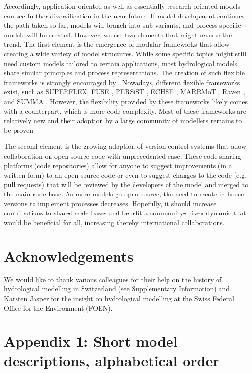 \documentclass[10pt,a4paper]{article}
\begin{document}
Accordingly, application-oriented as well as essentially
research-oriented models can see further diversification in the near
future. If model development continues the path taken so far, models
will branch into sub-variants, and process-specific models will be
created. However, we see two elements that might reverse the trend. The
first element is the emergence of modular frameworks that allow creating
a wide variety of model structures. While some specific topics might
still need custom models tailored to certain applications, most
hydrological models share similar principles and process
representations. The creation of such flexible frameworks is strongly
encouraged by \citet{Clark2011a}. Nowadays, different flexible
frameworks exist, such as SUPERFLEX, FUSE \citep{Clark2008},
PERSiST \citep{Futter2014}, ECHSE \citep{Kneis2015},
MARRMoT \citep{Knoben2019}, Raven \citep{Craig2020}, and
SUMMA \citep{Clark2015}. {However, the flexibility provided by these
frameworks likely comes with a counterpart, which is more code
complexity. Most of these frameworks are relatively new and their
adoption by a large community of modellers remains to be proven}. 

The second element is the growing adoption of version control systems
that allow collaboration on open-source code with unprecedented ease.
These code sharing platforms (code repositories) allow for anyone to
suggest improvements (in a written form) to an open-source code or even
to suggest changes to the code (e.g. pull requests) that will be
reviewed by the developers of the model and merged to the main code
base. As more models go open source, the need to create in-house
versions to implement processes decreases. Hopefully, it should increase
contributions to shared code bases and benefit a community-driven
dynamic that would be beneficial for all, increasing thereby
international collaborations.


\section*{Acknowledgements}

We would like to thank various colleagues for their help on the history
of hydrological modelling in Switzerland (see Supplementary Information)
and Karsten Jasper for the insight on hydrological modelling at the
Swiss Federal Office for the Environment (FOEN).


\section*{Appendix 1: Short model descriptions, alphabetical order}
\label{appendix:1}
\end{document}
